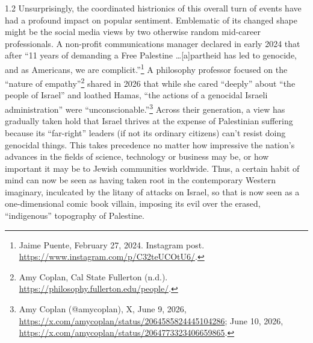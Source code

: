 \documentclass[../unravbook.tex]{subfiles}
\begin{document}
\begin{spacing}{1.2}
Unsurprisingly, the coordinated histrionics of this overall turn of events have had a profound impact on popular sentiment. Emblematic of its changed shape might be the social media views by two otherwise random mid-career professionals. A non-profit communications manager declared in early 2024 that after \enquote{11 years of demanding a Free Palestine \dots [a]partheid has led to genocide, and as Americans, we are complicit.}\footnote{Jaime Puente, February 27, 2024. Instagram post. \url{https://www.instagram.com/p/C32teUCOtU6/}.} A philosophy professor focused on the \enquote{nature of empathy}\footnote{Amy Coplan, Cal State Fullerton (n.d.). \url{https://philosophy.fullerton.edu/people/}.} shared in 2026 that while she cared ``deeply'' about \enquote{the people of Israel} and loathed Hamas, \enquote{the actions of a genocidal Israeli administration} were \enquote{unconscionable.}\footnote{Amy Coplan (@amycoplan), X, June 9, 2026, \url{https://x.com/amycoplan/status/2064585824445104286}; June 10, 2026, \url{https://x.com/amycoplan/status/2064773323406659865}.} Across their generation, a view has gradually taken hold that Israel thrives at the expense of Palestinian suffering because its \enquote{far-right} leaders (if not its ordinary citizens) can't resist doing genocidal things. This takes precedence no matter how impressive the nation's advances in the fields of science, technology or business may be, or how important it may be to Jewish communities worldwide. Thus, a certain habit of mind can now be seen as having taken root in the contemporary Western imaginary, inculcated by the litany of attacks on Israel, so that is now seen as a one-dimensional comic book villain, imposing its evil over the erased, \enquote{indigenous} topography of Palestine.


\end{spacing}
\end{document}
